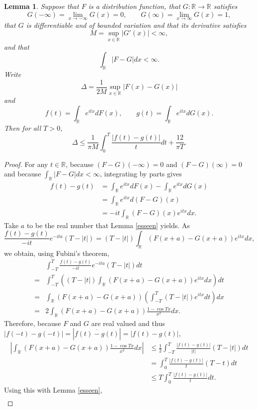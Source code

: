 \documentclass{article}
\newtheorem{lemma}[theorem]{Lemma}
\theoremstyle{definition}
\begin{document}
\begin{lemma}
Suppose that $F$ is a distribution function, that $G:\mathbb{R} \to \mathbb{R}$ satisfies
\[
G(-\infty)=\lim_{x \to -\infty} G(x) = 0, \qquad G(\infty) = \lim_{x \to \infty} G(x)=1,
\]
 that $G$ is differentiable and of bounded variation and that its derivative satisfies
\[
M=\sup_{x \in \mathbb{R}} |G'(x)| < \infty,
\]
and that
\[
\int_{\mathbb{R}} |F-G| dx < \infty.
\]
Write
\[
\Delta = \frac{1}{2M} \sup_{x \in \mathbb{R}} |F(x)-G(x)|
\]
and
\[
f(t) = \int_\mathbb{R} e^{itx} dF(x), \qquad g(t) = \int_\mathbb{R} e^{itx} dG(x).
\]
Then for all $T>0$,
\[
\Delta \leq \frac{1}{\pi M} \int_0^T \frac{|f(t)-g(t)|}{t} dt + \frac{12}{\pi T}.
\]
\label{characteristic}
\end{lemma}
\begin{proof}
For any $t \in \mathbb{R}$, because $(F-G)(-\infty)=0$ and $(F-G)(\infty)=0$ and because
$\int_\mathbb{R} |F-G| dx < \infty$, integrating by parts gives
\begin{align*}
f(t)-g(t)&= \int_\mathbb{R} e^{itx} dF(x)-\int_\mathbb{R} e^{itx} dG(x)\\
&=\int_{\mathbb{R}} e^{itx} d(F-G)(x)\\
&=-it \int_\mathbb{R} (F-G)(x) e^{itx} dx.
\end{align*}
Take $a$ to be the real number that Lemma \ref{esseen} yields. As 
\[
\frac{f(t)-g(t)}{-it} e^{-ita}(T-|t|) = (T-|t|) \int_\mathbb{R} (F(x+a)-G(x+a)) e^{itx} dx,
\]
we obtain, using Fubini's theorem,
\[
\begin{split}
&\int_{-T}^T \frac{f(t)-g(t)}{-it} e^{-ita}(T-|t|) dt\\
=&\int_{-T}^T \left((T-|t|) \int_\mathbb{R} (F(x+a)-G(x+a)) e^{itx} dx\right) dt\\
=&\int_\mathbb{R} (F(x+a)-G(x+a)) \left( \int_{-T}^T (T-|t|)e^{itx} dt \right) dx\\
=&2 \int_\mathbb{R} (F(x+a)-G(x+a)) \frac{1-\cos Tx}{x^2} dx.
\end{split}
\]
Therefore, because $F$ and $G$ are real valued and thus 
$|f(-t)-g(-t)|=|\overline{f(t)-g(t)}|=|f(t)-g(t)|$,
\begin{align*}
\left|\int_\mathbb{R} (F(x+a)-G(x+a)) \frac{1-\cos Tx}{x^2} dx\right|&\leq \frac{1}{2} \int_{-T}^T \frac{|f(t)-g(t)|}{|t|} (T-|t|)
dt\\
&=\int_0^T \frac{|f(t)-g(t)|}{t} (T-t) dt\\
&\leq T \int_0^T \frac{|f(t)-g(t)|}{t} dt.
\end{align*}
Using this with Lemma \ref{esseen},
\begin{align*}

\end{align*}
\end{proof}
\end{document}
